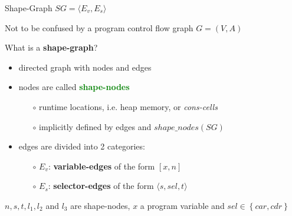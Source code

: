 \documentclass[xcolor={usenames,dvipsnames}]{beamer}
\renewcommand{\emph}[1]{\alert{#1}}
\begin{document}
\begin{frame}[fragile]{Shape-Graph $SG = \langle E_v, E_s \rangle$}

	\emph{Not} to be confused by a program control flow graph $G = (V, A)$


	\vspace{1em}
	What is a \textbf{shape-graph}?

	\begin{itemize}
	\item directed graph with nodes and edges
	\item nodes are called \textcolor{Green}{\textbf{shape-nodes}}
		\begin{itemize}
		\item[$\circ$] runtime locations, i.e. heap memory, or \textit{cons-cells}
		\item[$\circ$] implicitly defined by edges and $shape\_nodes(SG)$
		\end{itemize}
	\item edges are divided into 2 categories:
		\begin{itemize}
    	\item[$\circ$] \textcolor{VariableEdge}{$E_v$: \textbf{variable-edges}} of the form $ \left[x, n\right] $
    	\item[$\circ$] \textcolor{SelectorEdge}{$E_s$: \textbf{selector-edges}} of the form $ \langle s, sel, t \rangle $
		\end{itemize}
	\end{itemize}

	\begin{center}
  \end{center}

	$n, s, t, l_1, l_2$ and $l_3$ are shape-nodes, $x$ a program variable and $sel \in \left\{ car, cdr \right\}$

\end{frame}
\end{document}
